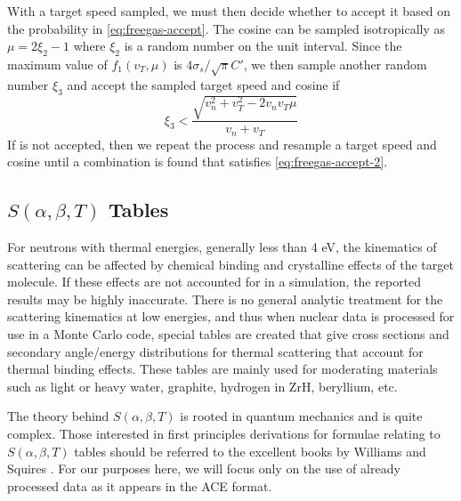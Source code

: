 With a target speed sampled, we must then decide whether to accept it based on
the probability in \eqref{eq:freegas-accept}. The cosine can be sampled
isotropically as $\mu = 2\xi_2 - 1$ where $\xi_2$ is a random number on the unit
interval. Since the maximum value of $f_1(v_T, \mu)$ is $4\sigma_s / \sqrt{\pi}
C'$, we then sample another random number $\xi_3$ and accept the sampled target
speed and cosine if
\begin{equation}
  \label{eq:freegas-accept-2}
  \xi_3 < \frac{\sqrt{v_n^2 + v_T^2 - 2 v_n v_T \mu}}{v_n + v_T}
\end{equation}
If is not accepted, then we repeat the process and resample a target speed and
cosine until a combination is found that satisfies \eqref{eq:freegas-accept-2}.

\subsection{\texorpdfstring{$S(\alpha,\beta,T)$}{S(a,b,T)} Tables}

For neutrons with thermal energies, generally less than 4 eV, the kinematics of
scattering can be affected by chemical binding and crystalline effects of the
target molecule. If these effects are not accounted for in a simulation, the
reported results may be highly inaccurate. There is no general analytic
treatment for the scattering kinematics at low energies, and thus when nuclear
data is processed for use in a Monte Carlo code, special tables are created that
give cross sections and secondary angle/energy distributions for thermal
scattering that account for thermal binding effects. These tables are mainly
used for moderating materials such as light or heavy water, graphite, hydrogen
in ZrH, beryllium, etc.

The theory behind $S(\alpha,\beta,T)$ is rooted in quantum mechanics and is
quite complex. Those interested in first principles derivations for formulae
relating to $S(\alpha,\beta,T)$ tables should be referred to the excellent books
by Williams \cite{Williams-1966} and Squires \cite{squires-1978}. For our
purposes here, we will focus only on the use of already processed data as it
appears in the ACE format.

